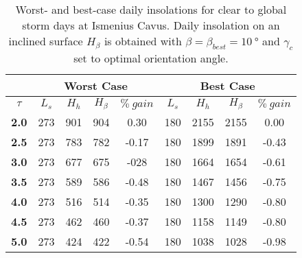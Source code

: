 \begin{table}[h]
\footnotesize
\centering
\caption[Worst- and best-case daily insolations for global storm days at Ismenius Cavus]
{Worst- and best-case daily insolations for clear to global storm days at Ismenius Cavus. Daily insolation on an inclined surface $H_{\beta}$ is obtained with $\beta = \beta_{best} = \SI{10}{\degree}$ and $\gamma_{c}$ set to optimal orientation angle.}
\label{tab:insolation-ismenius-cavus-global-storm-days}
\begin{tabular}{c|c|c|c|c|c|c|c|c|}
\cline{2-9}
\multicolumn{1}{l|}{} & \multicolumn{4}{c|}{\textbf{Worst Case}} & \multicolumn{4}{c|}{\textbf{Best Case}} \\ \hline
\multicolumn{1}{|c|}{$\tau$} & $L_{s}$ & $H_{h}$ & $H_{\beta}$ & $\%\:gain$ & $L_{s}$ & $H_{h}$ & $H_{\beta}$ & $\%\:gain$ \\ \hline
\multicolumn{1}{|c|}{\textbf{2.0}} & 273 & 901 & 904 & 0.30 & 180 & 2155 & 2155 & 0.00 \\ \hline
\multicolumn{1}{|c|}{\textbf{2.5}} & 273 & 783 & 782 & -0.17 & 180 & 1899 & 1891 & -0.43 \\ \hline
\multicolumn{1}{|c|}{\textbf{3.0}} & 273 & 677 & 675 & -028 & 180 & 1664 & 1654 & -0.61 \\ \hline
\multicolumn{1}{|c|}{\textbf{3.5}} & 273 & 589 & 586 & -0.48 & 180 & 1467 & 1456 & -0.75 \\ \hline
\multicolumn{1}{|c|}{\textbf{4.0}} & 273 & 516 & 514 & -0.35 & 180 & 1300 & 1290 & -0.80 \\ \hline
\multicolumn{1}{|c|}{\textbf{4.5}} & 273 & 462 & 460 & -0.37 & 180 & 1158 & 1149 & -0.80 \\ \hline
\multicolumn{1}{|c|}{\textbf{5.0}} & 273 & 424 & 422 & -0.54 & 180 & 1038 & 1028 & -0.98 \\ \hline
\end{tabular}
\end{table}
